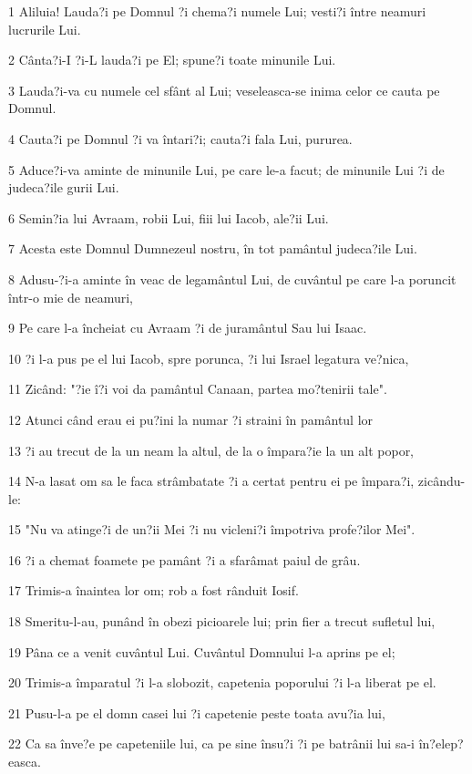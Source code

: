 \par 1 Aliluia! Lauda?i pe Domnul ?i chema?i numele Lui; vesti?i între neamuri lucrurile Lui.
\par 2 Cânta?i-I ?i-L lauda?i pe El; spune?i toate minunile Lui.
\par 3 Lauda?i-va cu numele cel sfânt al Lui; veseleasca-se inima celor ce cauta pe Domnul.
\par 4 Cauta?i pe Domnul ?i va întari?i; cauta?i fala Lui, pururea.
\par 5 Aduce?i-va aminte de minunile Lui, pe care le-a facut; de minunile Lui ?i de judeca?ile gurii Lui.
\par 6 Semin?ia lui Avraam, robii Lui, fiii lui Iacob, ale?ii Lui.
\par 7 Acesta este Domnul Dumnezeul nostru, în tot pamântul judeca?ile Lui.
\par 8 Adusu-?i-a aminte în veac de legamântul Lui, de cuvântul pe care l-a poruncit într-o mie de neamuri,
\par 9 Pe care l-a încheiat cu Avraam ?i de juramântul Sau lui Isaac.
\par 10 ?i l-a pus pe el lui Iacob, spre porunca, ?i lui Israel legatura ve?nica,
\par 11 Zicând: "?ie î?i voi da pamântul Canaan, partea mo?tenirii tale".
\par 12 Atunci când erau ei pu?ini la numar ?i straini în pamântul lor
\par 13 ?i au trecut de la un neam la altul, de la o împara?ie la un alt popor,
\par 14 N-a lasat om sa le faca strâmbatate ?i a certat pentru ei pe împara?i, zicându-le:
\par 15 "Nu va atinge?i de un?ii Mei ?i nu vicleni?i împotriva profe?ilor Mei".
\par 16 ?i a chemat foamete pe pamânt ?i a sfarâmat paiul de grâu.
\par 17 Trimis-a înaintea lor om; rob a fost rânduit Iosif.
\par 18 Smeritu-l-au, punând în obezi picioarele lui; prin fier a trecut sufletul lui,
\par 19 Pâna ce a venit cuvântul Lui. Cuvântul Domnului l-a aprins pe el;
\par 20 Trimis-a împaratul ?i l-a slobozit, capetenia poporului ?i l-a liberat pe el.
\par 21 Pusu-l-a pe el domn casei lui ?i capetenie peste toata avu?ia lui,
\par 22 Ca sa înve?e pe capeteniile lui, ca pe sine însu?i ?i pe batrânii lui sa-i în?elep?easca.
